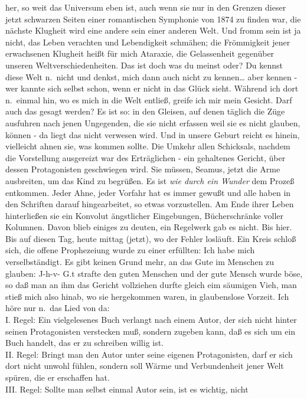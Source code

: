 \documentclass[
]{article}
\begin{document}
her, so weit das Universum eben ist, auch wenn sie nur in den Grenzen
dieser jetzt schwarzen Seiten einer romantischen Symphonie von 1874 zu
finden war, die nächste Klugheit wird eine andere sein einer anderen
Welt. Und fromm sein ist ja nicht, das Leben verachten und Lebendigkeit
schmähen; die Frömmigkeit jener erwachsenen Klugheit heißt für mich
Ataraxie, die Gelassenheit gegenüber unseren Weltverschiedenheiten. Das
ist doch was du meinst oder? Du kennst diese Welt n.~nicht und denkst,
mich dann auch nicht zu kennen\ldots{} aber kennen - wer kannte sich
selbst schon, wenn er nicht in das Glück sieht. Während ich dort
n.~einmal hin, wo es mich in die Welt entließ, greife ich mir mein
Gesicht. Darf auch das gesagt werden? Es ist so: in den Gleisen, auf
denen täglich die Züge ausfuhren nach jenen Ungegenden, die sie nicht
erfassen weil sie es nicht glauben, können - da liegt das nicht verwesen
wird. Und in unsere Geburt reicht es hinein, vielleicht ahnen sie, was
kommen sollte. Die Umkehr allen Schicksals, nachdem die Vorstellung
ausgereizt war des Erträglichen - ein gehaltenes Gericht, über dessen
Protagonisten geschwiegen wird. Sie müssen, Seamus, jetzt die Arme
ausbreiten, um das Kind zu begrüßen. Es ist \emph{wie durch ein Wunder}
dem Prozeß entkommen. Jeder Ahne, jeder Vorfahr hat es immer gewußt und
alle haben in den Schriften darauf hingearbeitet, so etwas vorzustellen.
Am Ende ihrer Leben hinterließen sie ein Konvolut ängstlicher
Eingebungen, Bücherschränke voller Kolumnen. Davon blieb einiges zu
deuten, ein Regelwerk gab es nicht. Bis hier. Bis auf diesen Tag, heute
mittag (jetzt), wo der Fehler losläuft. Ein Kreis schloß sich, die
offene Prophezeiung wurde zu einer erfüllten: Ich habe mich
verselbständigt. Es gibt keinen Grund mehr, an das Gute im Menschen zu
glauben: J-h-v- G.t strafte den guten Menschen und der gute Mensch wurde
böse, so daß man an ihm das Gericht vollziehen durfte gleich eim
säumigen Vieh, man stieß mich also hinab, wo sie hergekommen waren, in
glaubenslose Vorzeit. Ich höre nur n.~das Lied von da:\\
I. Regel: Ein vielgelesenes Buch verlangt nach einem Autor, der sich
nicht hinter seinen Protagonisten verstecken muß, sondern zugeben kann,
daß es sich um ein Buch handelt, das er zu schreiben willig ist.\\
II. Regel: Bringt man den Autor unter seine eigenen Protagonisten, darf
er sich dort nicht unwohl fühlen, sondern soll Wärme und Verbundenheit
jener Welt spüren, die er erschaffen hat.\\
III. Regel: Sollte man selbst einmal Autor sein, ist es wichtig, nicht
\end{document}
